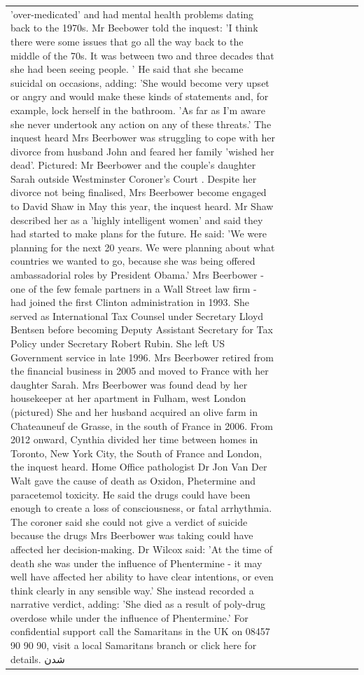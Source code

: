 \begin{table}[H]
\begin{tabular}{lllrlllll}
'over-medicated' and had mental health problems dating back to the 1970s. Mr Beebower told the inquest: 'I think there were some issues that go all the way back to the middle of the 70s. It was between two and three decades that she had been seeing people. ' He said that she became suicidal on occasions, adding: 'She would become very upset or angry and would make these kinds of statements and, for example, lock herself in the bathroom. 'As far as I'm aware she never undertook any action on any of these threats.' The inquest heard Mrs Beerbower was struggling to cope with her divorce from husband John and feared her family 'wished her dead'. Pictured: Mr Beerbower and the couple's daughter Sarah outside Westminster Coroner's Court . Despite her divorce not being finalised, Mrs Beerbower become engaged to David Shaw in May this year, the inquest heard. Mr Shaw described her as a 'highly intelligent women' and said they had started to make plans for the future. He said: 'We were planning for the next 20 years. We were planning about what countries we wanted to go, because she was being offered ambassadorial roles by President Obama.' Mrs Beerbower - one of the few female partners in a Wall Street law firm - had joined the first Clinton administration in 1993. She served as International Tax Counsel under Secretary Lloyd Bentsen before becoming Deputy Assistant Secretary for Tax Policy under Secretary Robert Rubin. She left US Government service in late 1996. Mrs Beerbower retired from the financial business in 2005 and moved to France with her daughter Sarah. Mrs Beerbower was found dead by her housekeeper at her apartment in Fulham, west London (pictured) She and her husband acquired an olive farm in Chateauneuf de Grasse, in the south of France in 2006. From 2012 onward, Cynthia divided her time between homes in Toronto, New York City, the South of France and London, the inquest heard. Home Office pathologist Dr Jon Van Der Walt gave the cause of death as Oxidon, Phetermine and paracetemol toxicity. He said the drugs could have been enough to create a loss of consciousness, or fatal arrhythmia. The coroner said she could not give a verdict of suicide because the drugs Mrs Beerbower was taking could have affected her decision-making. Dr Wilcox said: 'At the time of death she was under the influence of Phentermine - it may well have affected her ability to have clear intentions, or even think clearly in any sensible way.' She instead recorded a narrative verdict, adding: 'She died as a result of poly-drug overdose while under the influence of Phentermine.' For confidential support call the Samaritans in the UK on 08457 90 90 90, visit a local Samaritans branch or click here for details. شدن \\

\end{tabular}
\end{table}
